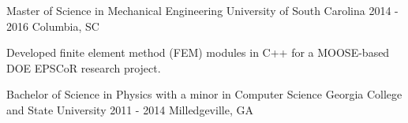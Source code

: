 

\begin{cventries}

  \cventry
  {Master of Science in Mechanical Engineering} %
  {University of South Carolina} %
  {2014 - 2016} %
  {Columbia, SC} %
  {
    \begin{cvitems} %
      \item {Developed finite element method (FEM) modules in C++ for a MOOSE-based DOE EPSCoR research project.}
    \end{cvitems}
  }
  \cventry
  {Bachelor of Science in Physics with a minor in Computer Science} %
  {Georgia College and State University} %
  {2011 - 2014} %
  {Milledgeville, GA} %
  {}
\end{cventries}
